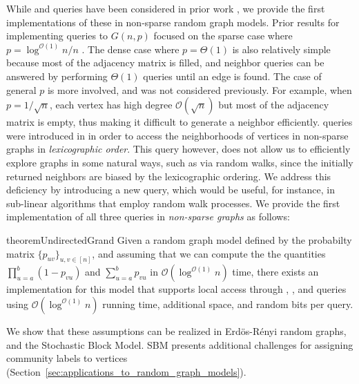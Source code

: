 While  and  queries %
have been considered in prior work \cite{reut, huge_old, sparse},
we provide the first implementations of these in non-sparse random graph models.
Prior results for implementing queries to $G(n,p)$ focused on the sparse case where $p = \log^{\mathcal O(1)} n/n$ \cite{sparse}.
The dense case where $p = \Theta(1)$ is also relatively simple because most of the adjacency matrix is filled,
and neighbor queries can be answered by performing $\Theta(1)$  queries until an edge is found.
The case of general $p$ is more involved, and was not considered previously.
For example, when $p = 1/\sqrt{n}$, each vertex has high degree $\mathcal O(\sqrt{n})$ but most of the adjacency matrix is empty,
thus making it difficult to generate a neighbor efficiently.
 queries were introduced in \cite{reut}
in order to access the neighborhoods of vertices in non-sparse graphs in \emph{lexicographic order}.
This query however, does not allow us to efficiently explore graphs in some natural ways, such as via random walks,
since the initially returned neighbors are biased by the lexicographic ordering.
We address this deficiency by introducing a new  query,
which would be useful, for instance, in sub-linear algorithms that employ random walk processes.
We provide the first implementation of all three queries in \emph{non-sparse graphs} as follows:

\begin{restatable}{theorem}{UndirectedGrand}
\label{thm:grand}
Given a random graph model defined by the probabilty matrix $\{ p_{uv}\}_{u,v\in [n]}$,
and assuming that we can compute the the quantities $\prod_{u=a}^b (1-p_{vu})$ and $\sum_{u=a}^b p_{vu}$ in $\mathcal O(\log^{\mathcal O(1)} n)$ time,
there exists an implementation for this model that supports local access through , ,
and  queries using $\mathcal O(\log^{\mathcal O(1)} n)$ running time, additional space, and random bits per query.
\end{restatable}

We show that these assumptions can be realized in Erd\"os-R\'enyi random graphs, and the Stochastic Block Model.
SBM presents additional challenges for assigning community labels to vertices (Section~\ref{sec:applications_to_random_graph_models}).



